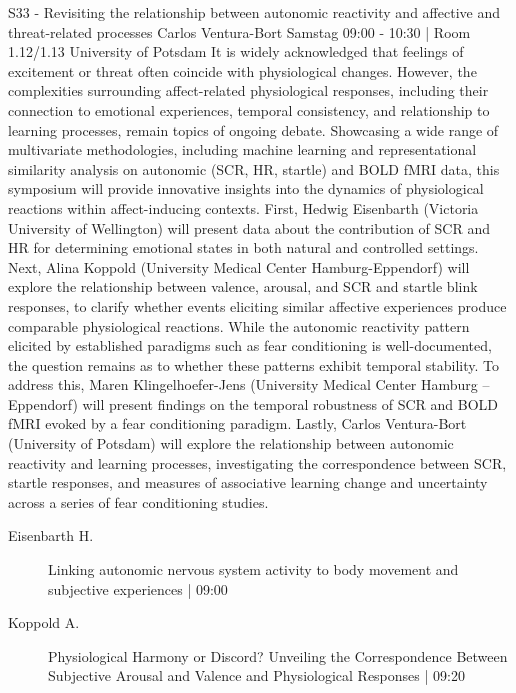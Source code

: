 
            \begin{symposium}
            {S33 - Revisiting the relationship between autonomic reactivity and affective and threat-related processes }
            {Carlos Ventura-Bort }
            {Samstag 09:00 - 10:30 | Room 1.12/1.13}
            {University of Potsdam}
            It is widely acknowledged that feelings of excitement or threat often coincide with physiological changes. However, the complexities surrounding affect-related physiological responses, including their connection to emotional experiences, temporal consistency, and relationship to learning processes, remain topics of ongoing debate. Showcasing a wide range of multivariate methodologies, including machine learning and representational similarity analysis on autonomic (SCR, HR, startle) and BOLD fMRI data, this symposium will provide innovative insights into the dynamics of physiological reactions within affect-inducing contexts.
First, Hedwig Eisenbarth (Victoria University of Wellington) will present data about the contribution of SCR and HR for determining emotional states in both natural and controlled settings. Next, Alina Koppold (University Medical Center Hamburg-Eppendorf) will explore the relationship between valence, arousal, and SCR and startle blink responses, to clarify whether events eliciting similar affective experiences produce comparable physiological reactions. While the autonomic reactivity pattern elicited by established paradigms such as fear conditioning is well-documented, the question remains as to whether these patterns exhibit temporal stability. To address this, Maren Klingelhoefer-Jens (University Medical Center Hamburg – Eppendorf) will present findings on the temporal robustness of SCR and BOLD fMRI evoked by a fear conditioning paradigm. Lastly, Carlos Ventura-Bort (University of Potsdam) will explore the relationship between autonomic reactivity and learning processes, investigating the correspondence between SCR, startle responses, and measures of associative learning change and uncertainty across a series of fear conditioning studies.
            \begin{description}    
            
                \item [ Eisenbarth H.] Linking autonomic nervous system activity to body movement and subjective experiences \textcolor{mygray}{ | 09:00}    
                
                \item [ Koppold A.] Physiological Harmony or Discord? Unveiling the Correspondence Between Subjective Arousal and Valence and Physiological Responses \textcolor{mygray}{ | 09:20}    
                

\end{description}
\end{symposium}
